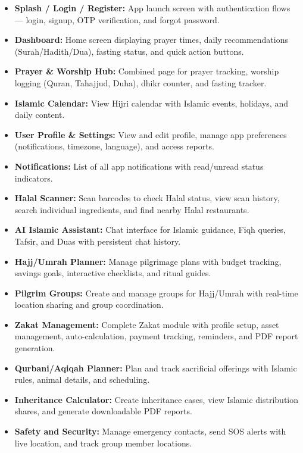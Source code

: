 \documentclass[12pt,a4paper]{article}
\begin{document}
\begin{itemize}[leftmargin=2em, label=\textbullet, itemsep=4pt]
  \item \textbf{Splash / Login / Register:} App launch screen with authentication flows --- login, signup, OTP verification, and forgot password.

  \item \textbf{Dashboard:} Home screen displaying prayer times, daily recommendations (Surah/Hadith/Dua), fasting status, and quick action buttons.

  \item \textbf{Prayer \& Worship Hub:} Combined page for prayer tracking, worship logging (Quran, Tahajjud, Duha), dhikr counter, and fasting tracker.

  \item \textbf{Islamic Calendar:} View Hijri calendar with Islamic events, holidays, and daily content.

  \item \textbf{User Profile \& Settings:} View and edit profile, manage app preferences (notifications, timezone, language), and access reports.

  \item \textbf{Notifications:} List of all app notifications with read/unread status indicators.

  \item \textbf{Halal Scanner:} Scan barcodes to check Halal status, view scan history, search individual ingredients, and find nearby Halal restaurants.

  \item \textbf{AI Islamic Assistant:} Chat interface for Islamic guidance, Fiqh queries, Tafsir, and Duas with persistent chat history.

  \item \textbf{Hajj/Umrah Planner:} Manage pilgrimage plans with budget tracking, savings goals, interactive checklists, and ritual guides.

  \item \textbf{Pilgrim Groups:} Create and manage groups for Hajj/Umrah with real-time location sharing and group coordination.

  \item \textbf{Zakat Management:} Complete Zakat module with profile setup, asset management, auto-calculation, payment tracking, reminders, and PDF report generation.

  \item \textbf{Qurbani/Aqiqah Planner:} Plan and track sacrificial offerings with Islamic rules, animal details, and scheduling.

  \item \textbf{Inheritance Calculator:} Create inheritance cases, view Islamic distribution shares, and generate downloadable PDF reports.

  \item \textbf{Safety and Security:} Manage emergency contacts, send SOS alerts with live location, and track group member locations.
\end{itemize}
\newpage
\end{document}
